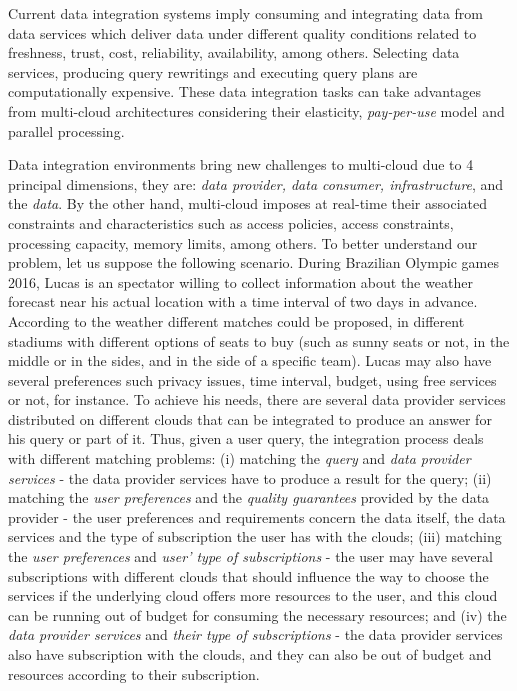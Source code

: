 Current data integration systems imply consuming and integrating data from data services which deliver data under different quality conditions related to freshness, trust, cost, reliability, availability, among others. Selecting data services, producing query rewritings and executing query plans are computationally expensive. These data integration tasks can take advantages from multi-cloud architectures considering their elasticity, \textit{pay-per-use} model and parallel processing.

Data integration environments bring new challenges to multi-cloud due to 4
principal dimensions, they are: \textit{data provider, data consumer,
infrastructure}, and the \textit{data}. By the other hand, multi-cloud imposes at
real-time their associated constraints and characteristics such as access policies, access constraints,
processing capacity, memory limits, among others. 
%
To better understand our problem, let us suppose the following scenario. 
During Brazilian Olympic games 2016, Lucas is an spectator willing to collect information about the weather forecast near his actual location with a time interval of two days in advance. According to the weather different matches could be proposed, in different stadiums with different options of seats to buy (such as sunny seats or not, in the middle or in the sides, and in the side of a specific team).
%
Lucas may also have several preferences such privacy issues, time interval, budget, using free services or not, for instance. 
%
To achieve his needs, there are several data provider services distributed on different clouds that can be integrated to produce an answer for his query or part of it. 
%
Thus, given a user query, the integration process deals with different matching problems: 
(i) matching the \textit{query} and \textit{data provider services} - the data provider services have to produce a result for the query; 
(ii) matching the \textit{user preferences} and the \textit{quality guarantees} provided by the data provider - the user preferences and requirements concern the data itself, the data services and the type of subscription the user has with the clouds; 
(iii) matching the \textit{user preferences} and \textit{user' type of subscriptions} - the user may have several subscriptions with different clouds that should influence the way to choose the services if the underlying cloud offers more resources to the user, and this cloud can be running out of budget for consuming the necessary resources; and 
(iv) the \textit{data provider services} and \textit{their type of subscriptions} - the data provider services also have  subscription with the clouds, and they can also be out of budget and resources according to their subscription.

